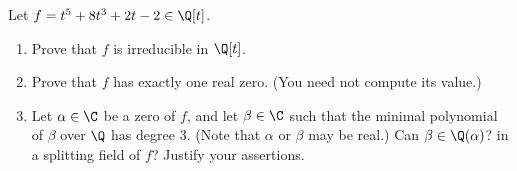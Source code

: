 %
%

\noindent{}Let $f = t^{5} + 8 t^{3} + 2 t - 2 \in \Q[t]$.
\begin{enumerate}[label=(\alph*)]
\item\label{itm : LQ05Ba} Prove that $f$ is irreducible in $\Q[t]$.
\item\label{itm : LQ05Bb} Prove that $f$ has exactly one real zero. (You need not compute its value.)
\item\label{itm : LQ05Bc} Let $\alpha \in \C$ be a zero of $f$, and let $\beta \in \C$ such that the minimal polynomial of $\beta$ over $\Q$ has degree $3$. (Note that $\alpha$ or $\beta$ may be real.) Can $\beta \in \Q(\alpha)$? in a splitting field of $f$? Justify your assertions.
\end{enumerate}